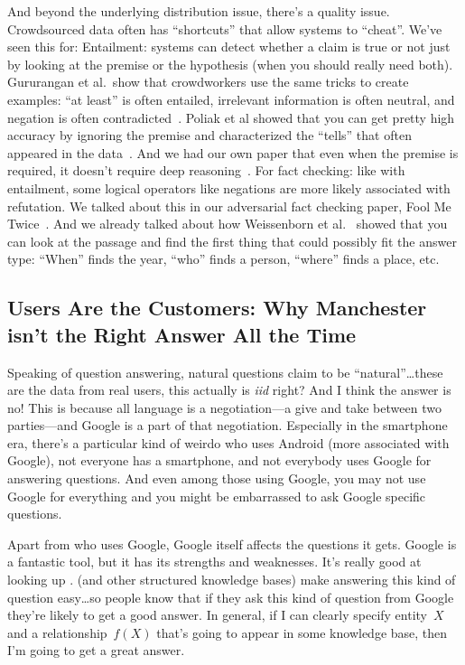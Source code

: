 And beyond the underlying distribution issue, there’s a quality issue.  
%
Crowdsourced data often has “shortcuts” that allow systems to “cheat”.
We’ve seen this for: Entailment: systems can detect whether a claim is
true or not just by looking at the premise or the hypothesis (when you
should really need both).
%
Gururangan et al.\ show that crowdworkers use the same tricks to create
examples: “at least” is often entailed, irrelevant information is
often neutral, and negation is often contradicted~\citep{gururangan-18}.
%
Poliak et al showed that you can get pretty high accuracy by ignoring
the premise and characterized the “tells” that often appeared in the
data~\citep{poliak-18}.
%
And we had our own paper that even when the premise is required, it
doesn’t require deep reasoning~\citep{kaushik-18}.
%
For fact checking: like with entailment, some logical operators like
negations are more likely associated with refutation.  We talked about
this in our adversarial fact checking paper, Fool Me Twice~\citep{Eisenschlos-21}.
%
And we already talked about how Weissenborn et al.~\citep{weissenborn-17} showed that you
can look at the passage and find the first thing that could possibly
fit the answer type: ``When'' finds the year, ``who'' finds a person,
``where'' finds a place, etc.

\subsection{Users Are the Customers: Why Manchester isn't the Right Answer All the Time}

Speaking of question answering, natural questions claim to be
``natural''\dots these are the data from real users, this actually is
\textit{iid} right?
%
And I think the answer is no!  This is because all language is a
negotiation—a give and take between two parties—and Google is a part
of that negotiation.
%
Especially in the smartphone era, there's a particular kind of weirdo
who uses Android (more associated with Google), not everyone has a
smartphone, and not everybody uses Google for answering questions.
%
And even among those using Google, you may not use Google for
everything and you might be embarrassed to ask Google specific
questions.

Apart from who uses Google, Google itself affects the questions it
gets.
%
Google is a fantastic tool, but it has its strengths and weaknesses.
%
It’s really good at looking up .
%
 (and other structured knowledge bases) make answering this
kind of question easy\dots so people know that if they ask this kind
of question from Google they’re likely to get a good answer.
%
In general, if I can clearly specify entity~$X$ and a
relationship~$f(X)$ that’s going to appear in some knowledge base,
then I’m going to get a great answer.

